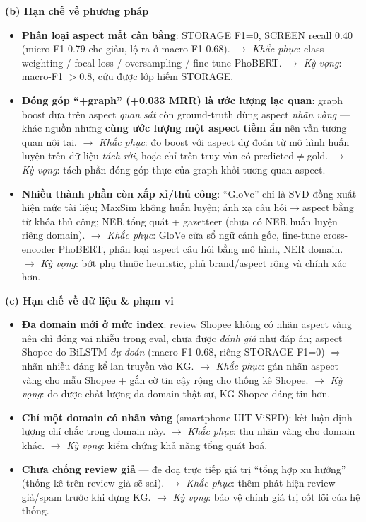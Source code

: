 \documentclass[12pt,a4paper]{article}
\begin{document}
\smallskip\noindent\textbf{(b) Hạn chế về phương pháp}
\begin{itemize}[leftmargin=1.5cm,itemsep=2pt]
  \item \textbf{Phân loại aspect mất cân bằng}: STORAGE F1=0, SCREEN recall 0.40 (micro-F1 0.79 che giấu, lộ ra ở macro-F1 0.68). $\to$ \textit{Khắc phục}: class weighting / focal loss / oversampling / fine-tune PhoBERT. $\to$ \textit{Kỳ vọng}: macro-F1 $>$0.8, cứu được lớp hiếm STORAGE.
  \item \textbf{Đóng góp ``+graph'' (+0.033 MRR) là ước lượng lạc quan}: graph boost dựa trên aspect \textit{quan sát} còn ground-truth dùng aspect \textit{nhãn vàng} --- khác nguồn nhưng \textbf{cùng ước lượng một aspect tiềm ẩn} nên vẫn tương quan nội tại. $\to$ \textit{Khắc phục}: đo boost với aspect dự đoán từ mô hình huấn luyện trên dữ liệu \textit{tách rời}, hoặc chỉ trên truy vấn có predicted$\neq$gold. $\to$ \textit{Kỳ vọng}: tách phần đóng góp thực của graph khỏi tương quan aspect.
  \item \textbf{Nhiều thành phần còn xấp xỉ/thủ công}: ``GloVe'' chỉ là SVD đồng xuất hiện mức tài liệu; MaxSim không huấn luyện; ánh xạ câu hỏi$\to$aspect bằng từ khóa thủ công; NER tổng quát + gazetteer (chưa có NER huấn luyện riêng domain). $\to$ \textit{Khắc phục}: GloVe cửa sổ ngữ cảnh gốc, fine-tune cross-encoder PhoBERT, phân loại aspect câu hỏi bằng mô hình, NER domain. $\to$ \textit{Kỳ vọng}: bớt phụ thuộc heuristic, phủ brand/aspect rộng và chính xác hơn.
\end{itemize}

\smallskip\noindent\textbf{(c) Hạn chế về dữ liệu \& phạm vi}
\begin{itemize}[leftmargin=1.5cm,itemsep=2pt]
  \item \textbf{Đa domain mới ở mức index}: review Shopee không có nhãn aspect vàng nên chỉ đóng vai nhiễu trong eval, chưa được \textit{đánh giá} như đáp án; aspect Shopee do BiLSTM \textit{dự đoán} (macro-F1 0.68, riêng STORAGE F1=0) $\Rightarrow$ nhãn nhiễu đáng kể lan truyền vào KG. $\to$ \textit{Khắc phục}: gán nhãn aspect vàng cho mẫu Shopee + gắn cờ tin cậy rộng cho thống kê Shopee. $\to$ \textit{Kỳ vọng}: đo được chất lượng đa domain thật sự, KG Shopee đáng tin hơn.
  \item \textbf{Chỉ một domain có nhãn vàng} (smartphone UIT-ViSFD): kết luận định lượng chỉ chắc trong domain này. $\to$ \textit{Khắc phục}: thu nhãn vàng cho domain khác. $\to$ \textit{Kỳ vọng}: kiểm chứng khả năng tổng quát hoá.
  \item \textbf{Chưa chống review giả} --- đe doạ trực tiếp giá trị ``tổng hợp xu hướng'' (thống kê trên review giả sẽ sai). $\to$ \textit{Khắc phục}: thêm phát hiện review giả/spam trước khi dựng KG. $\to$ \textit{Kỳ vọng}: bảo vệ chính giá trị cốt lõi của hệ thống.
\end{itemize}
\end{document}
